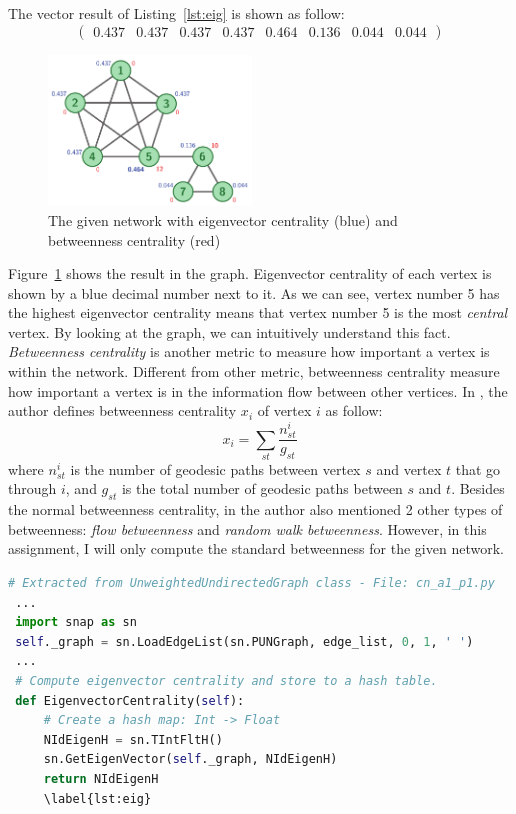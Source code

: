 \documentclass[a4paper,12pt]{article}
\begin{document}
\noindent
The vector result of Listing~\ref{lst:eig} is shown as follow:
\[ \left( \begin{array}{cccccccc} 0.437 & 0.437 & 0.437 & 0.437 & 0.464 & 0.136 & 0.044 & 0.044 \end{array} \right) \]
\begin{figure}
    \vspace{-1em}
    \centering
      \includegraphics[width=0.48\textwidth]{cn_a2_eigbet}
    \caption{The given network with eigenvector centrality (blue) and betweenness centrality (red)}
    \label{fig:eigbet}
    \vspace{-1em}
\end{figure}
\noindent
Figure~\ref{fig:eigbet} shows the result in the graph. Eigenvector centrality of each vertex is shown by a blue decimal number next to it. As we can see, vertex number 5 has the highest eigenvector centrality means that vertex number 5 is the most \emph{central} vertex. By looking at the graph, we can intuitively understand this fact.
\newline
\noindent
\emph{Betweenness centrality} is another metric to measure how important a vertex is within the network. Different from other metric, betweenness centrality measure how important a vertex is in the information flow between other vertices. In \cite{net}, the author defines betweenness centrality $x_i$ of vertex $i$ as follow:
$$ x_i = \displaystyle \sum_{st} \frac{n_{st}^i}{g_{st}} $$
where $n^i_{st}$ is the number of geodesic paths between vertex $s$ and vertex $t$ that go through $i$, and $g_{st}$ is the total number of geodesic paths between $s$ and $t$. Besides the normal betweenness centrality, in \cite{net} the author also mentioned 2 other types of betweenness: \emph{flow betweenness} and \emph{random walk betweenness}. However, in this assignment, I will only compute the standard betweenness for the given network.

\begin{lstlisting}[language=Python, caption={Eigenvector centrality computation with SNAP.PY}]
 # Extracted from UnweightedUndirectedGraph class - File: cn_a1_p1.py
 ...
 import snap as sn
 self._graph = sn.LoadEdgeList(sn.PUNGraph, edge_list, 0, 1, ' ')
 ...
 # Compute eigenvector centrality and store to a hash table.
 def EigenvectorCentrality(self):
     # Create a hash map: Int -> Float
     NIdEigenH = sn.TIntFltH()
     sn.GetEigenVector(self._graph, NIdEigenH)
     return NIdEigenH
     \label{lst:eig}
\end{lstlisting}



\end{document}
